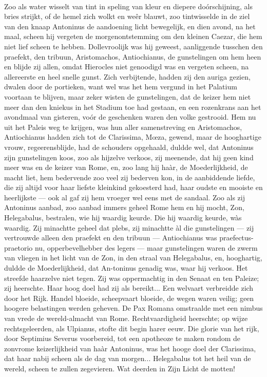 \documentclass[a4paper, 12pt, oneside, dutch]{article}
\begin{document}
\paragraph{}
Zoo als water wisselt van tint in speling van kleur en diepere doórschijning, als bries strijkt, of de hemel zich wolkt en weêr blauwt, zoo tintwisselde in de ziel van den knaap Antoninus de aandoening licht bewegelijk, en dien avond, na het maal, scheen hij vergeten de morgenontstemming om den kleinen Caezar, die hem niet lief scheen te hebben. Dollevroolijk was hij geweest, aanliggende tusschen den praefekt, den tribuun, Aristomachos, Antiochianus, de gunstelingen om hem heen en blijde zij allen, omdat Hierocles niet genoodigd was en vergeten scheen, na allereerste en heel snelle gunst. Zich verbijtende, hadden zij den auriga gezien, dwalen door de portieken, want wel was het hem vergund in het Palatium voortaan te blijven, maar zeker wisten de gunstelingen, dat de keizer hem niet meer dan den kniekus in het Stadium toe had gestaan, en een rozenkrans aan het avondmaal van gisteren, voór de geschenken waren den volke gestrooid. Hem nu uit het Paleis weg te krijgen, was hun aller samenstreving en Aristomachos, Antiochianus hadden zich tot de Clarissima, Mœza, gewend, maar de hooghartige vrouw, regeerensblijde, had de schouders opgehaald, duldde wel, dat Antoninus zijn gunstelingen koos, zoo als hijzelve verkoos, zij meenende, dat hij geen kind meer was en de keizer van Rome, en, zoo lang hij haàr, de Moederlijkheid, de macht liet, hem bedervende zoo veel zij bederven kon, in de aanbiddende liefde, die zij altijd voor haar liefste kleinkind gekoesterd had, haar oudste en mooiste en heerlijkste --- ook al gaf zij hem vroeger wel eens met de sandaal. Zoo als zij Antoninus aanbad, zoo aanbad immers geheel Rome hem en hij mocht, Zon, Helegabalus, bestralen, wie hij waardig keurde. Die hij waardig keurde, wàs waardig. Zij minachtte geheel dat plebs, zij minachtte àl die gunstelingen --- zij vertrouwde alleen den praefekt en den tribuun --- Antiochianus was praefectus-praetorio nu, opperbevelhebber des legers --- maar gunstelingen waren de zwerm van vliegen in het licht van de Zon, in den straal van Helegabalus, en, hooghartig, duldde de Moederlijkheid, dat An-toninus genadig was, waar hij verkoos. Het streefde haarzelve niet tegen. Zij was oppermachtig in den Senaat en ten Paleize; zij heerschte. Haar hoog doel had zij als bereikt... Een welvaart verbreidde zich door het Rijk. Handel bloeide, scheepvaart bloeide, de wegen waren veilig; geen hoogere belastingen werden geheven. De Pax Romana omstraalde met een nimbus van vrede de wereld-almacht van Rome. Rechtvaardigheid heerschte; op wijze rechtsgeleerden, als Ulpianus, stofte dit begin harer eeuw. Die glorie van het rijk, door Septimius Severus voorbereid, tot een apotheoze te maken rondom de zonvrome keizerlijkheid van haàr Antoninus, was het hooge doel der Clarissima, dat haar nabij scheen als de dag van morgen... Helegabalus tot het heil van de wereld, scheen te zullen zegevieren. Wat deerden in Zijn Licht de motten!
\end{document}

